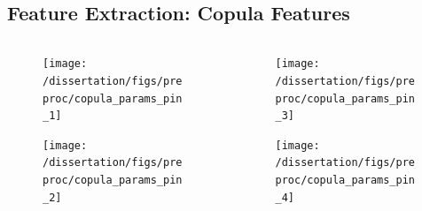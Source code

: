 \documentclass[t, pdftex]{beamer}
\begin{document}
\subsection*{Feature Extraction: Copula Features}
\begin{frame}
\vspace{-34pt}
\begin{columns}
    \begin{column}{0.5\textwidth}
        \begin{figure}[H]%
            \texttt{[image: /dissertation/figs/preproc/copula\_params\_pin\_1]}
        \end{figure}
    \vspace{-26pt}
            \begin{figure}[H]%
                \texttt{[image: /dissertation/figs/preproc/copula\_params\_pin\_2]}
            \end{figure}
    \end{column}
    \begin{column}{0.5\textwidth}
        \begin{figure}[H]%
            \texttt{[image: /dissertation/figs/preproc/copula\_params\_pin\_3]}
        \end{figure}
    \vspace{-26pt}
            \begin{figure}[H]%
                \texttt{[image: /dissertation/figs/preproc/copula\_params\_pin\_4]}
            \end{figure}
\end{column}
\end{columns}
\end{frame}
\end{document}
